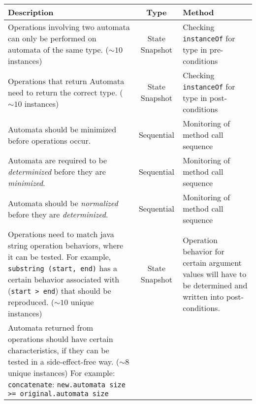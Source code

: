 \documentclass[letterpaper,11pt]{article}
\begin{document}
\begin{table}[ht]\label{tab:app-properties}
  \centering{}
  \begin{tabular}{p{5cm} c p{5cm}}
    \toprule
    \textbf{Description} & \textbf{Type} & \textbf{Method} \\
    \midrule
    Operations involving two automata can only be performed on automata of the
    same type. (\(\sim10\) instances) & State Snapshot &  Checking
                                                      \texttt{instanceOf}
                                                      for type in
                                                      pre-conditions \\
    \midrule
    Operations that return Automata need to return the correct type. (\(\sim10\)
    instances) & State Snapshot & Checking \texttt{instanceOf} for type in
                                  post-conditions \\
    \midrule
    Automata should be minimized before operations occur. & Sequential &
                                                                         Monitoring
                                                                         of
                                                                         method
                                                                         call
                                                                         sequence
    \\
    \midrule
    Automata are required to be \textit{determinized} before they are
    \textit{minimized}. & Sequential & Monitoring of method call sequence \\
    \midrule
    Automata should be \textit{normalized} before they are
    \textit{determinized}. & Sequential & Monitoring of method call sequence \\
    \midrule
    Operations need to match java string operation behaviors, where it can be
    tested.  For example, \texttt{substring~(start, end)} has a certain behavior
    associated with (\texttt{start > end}) that should be reproduced. (\(\sim10\) unique
    instances) & State Snapshot & Operation behavior for certain argument
                                  values will have to be determined and written
                                  into post-conditions. \\
    \midrule
    Automata returned from operations should have certain characteristics, if they can be tested in a side-effect-free way.
    (\(\sim8\) unique instances)
    For example:
    \texttt{concatenate}: \texttt{new.automata size >= original.automata size}

\end{tabular}
\end{table}
\end{document}

